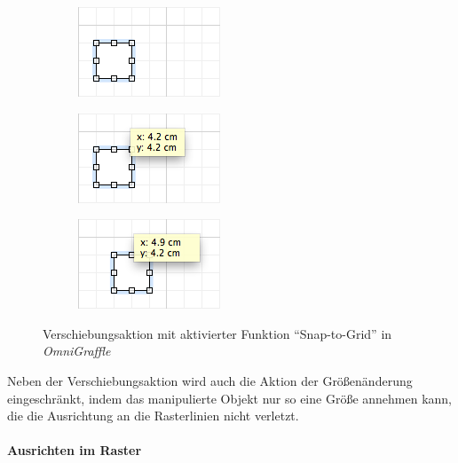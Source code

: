 \begin{figure}[hbt]
    \newcommand{\subfigurewidth}{0.33\textwidth}
    \newcommand{\graphicswidth}{0.95\linewidth}
    \begin{subfigure}{\subfigurewidth}
        \centering
        \includegraphics[width=\graphicswidth]{resources/omnigraffle-snap-to-grid-on-a}
        \caption{}
    \end{subfigure}
    \begin{subfigure}{\subfigurewidth}
        \centering
        \includegraphics[width=\graphicswidth]{resources/omnigraffle-snap-to-grid-on-b}
        \caption{}
    \end{subfigure}
    \begin{subfigure}{\subfigurewidth}
        \centering
        \includegraphics[width=\graphicswidth]{resources/omnigraffle-snap-to-grid-on-c}
        \caption{}
    \end{subfigure}
    \caption{Verschiebungsaktion mit aktivierter Funktion \enquote{Snap-to-Grid} in \textit{OmniGraffle}}
    \label{fig:omnigraffle-snap-to-grid-on}
\end{figure}

Neben der Verschiebungsaktion wird auch die Aktion der Größenänderung eingeschränkt, indem das manipulierte Objekt nur so eine Größe annehmen kann, die die Ausrichtung an die Rasterlinien nicht verletzt.

\paragraph{Ausrichten im Raster}

